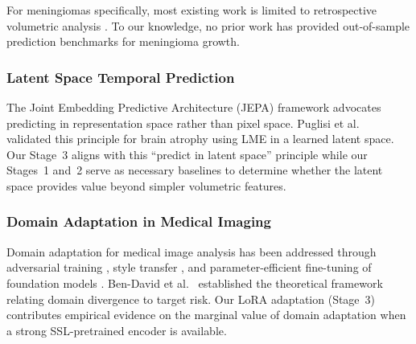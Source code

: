 For meningiomas specifically, most existing work is limited to retrospective
volumetric analysis \cite{hashimoto2012natural,ius2020management,
nakamura2003natural}. To our knowledge, no prior work has provided
out-of-sample prediction benchmarks for meningioma growth.

\subsubsection{Latent Space Temporal Prediction}

The Joint Embedding Predictive Architecture (JEPA) framework
\cite{lecun2022path} advocates predicting in representation space rather than
pixel space. Puglisi et al.\ \cite{puglisi2025brain} validated this principle
for brain atrophy using LME in a learned latent space. Our Stage~3 aligns
with this ``predict in latent space'' principle while our Stages~1 and~2 serve
as necessary baselines to determine whether the latent space provides value
beyond simpler volumetric features.

\subsubsection{Domain Adaptation in Medical Imaging}

Domain adaptation for medical image analysis has been addressed through
adversarial training \cite{kamnitsas2017unsupervised}, style transfer
\cite{chen2022maxstyle}, and parameter-efficient fine-tuning of foundation
models \cite{dutt2023parameter}. Ben-David et al.\ \cite{bendavid2010theory}
established the theoretical framework relating domain divergence to target
risk. Our LoRA adaptation (Stage~3) contributes empirical evidence on the
marginal value of domain adaptation when a strong SSL-pretrained encoder is
available.
